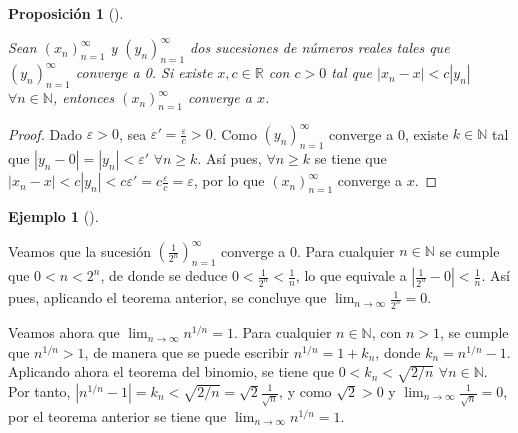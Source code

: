 \documentclass[
  a4paper,
]{scrreport}
\theoremstyle{definition}
\newtheorem{example}{Ejemplo}[chapter]
\theoremstyle{plain}
\theoremstyle{definition}
\theoremstyle{plain}
\theoremstyle{plain}
\newtheorem{proposition}{Proposición}[chapter]
\theoremstyle{remark}
\begin{document}
\leavevmode{}%
\begin{proposition}[]\label{prp-convergencia-sucesion-acotada}

Sean \((x_n)_{n=1}^\infty\) y \((y_n)_{n=1}^\infty\) dos sucesiones de
números reales tales que \((y_n)_{n=1}^\infty\) converge a 0. Si existe
\(x, c\in\mathbb{R}\) con \(c>0\) tal que \(|x_n-x| < c|y_n|\)
\(\forall n\in \mathbb{N}\), entonces \((x_n)_{n=1}^\infty\) converge a
\(x\).

\end{proposition}

\begin{tcolorbox}[enhanced jigsaw, breakable, arc=.35mm, colbacktitle=quarto-callout-note-color!10!white, toptitle=1mm, opacityback=0, colframe=quarto-callout-note-color-frame, colback=white, left=2mm, bottomrule=.15mm, opacitybacktitle=0.6, title=\textcolor{quarto-callout-note-color}{\faInfo}\hspace{0.5em}{Demostración}, toprule=.15mm, titlerule=0mm, coltitle=black, rightrule=.15mm, bottomtitle=1mm, leftrule=.75mm]

\begin{proof}

Dado \(\varepsilon>0\), sea \(\varepsilon'=\frac{\varepsilon}{c}>0\).
Como \((y_n)_{n=1}^\infty\) converge a 0, existe \(k\in\mathbb{N}\) tal
que \(|y_n-0|=|y_n|<\varepsilon'\) \(\forall n\geq k\). Así pues,
\(\forall n\geq k\) se tiene que
\(|x_n-x|<c|y_n|<c\varepsilon'=c\frac{\varepsilon}{c}=\varepsilon\), por
lo que \((x_n)_{n=1}^\infty\) converge a \(x\).

\end{proof}

\end{tcolorbox}

\leavevmode{}%
\begin{example}[]\label{exm-convergencia-sucesion-acotada}

Veamos que la sucesión \(\left(\frac{1}{2^n}\right)_{n=1}^\infty\)
converge a 0. Para cualquier \(n\in\mathbb{N}\) se cumple que
\(0<n<2^n\), de donde se deduce \(0<\frac{1}{2^n}<\frac{1}{n}\), lo que
equivale a \(|\frac{1}{2^n}-0|<\frac{1}{n}\). Así pues, aplicando el
teorema anterior, se concluye que \(\lim_{n\to\infty}\frac{1}{2^n}=0\).

Veamos ahora que \(\lim_{n\to\infty}n^{1/n}=1\). Para cualquier
\(n\in\mathbb{N}\), con \(n>1\), se cumple que \(n^{1/n}>1\), de manera
que se puede escribir \(n^{1/n} = 1+k_n\), donde \(k_n=n^{1/n}-1\).
Aplicando ahora el teorema del binomio, se tiene que
\(0<k_n<\sqrt{2/n}\) \(\forall n\in\mathbb{N}\). Por tanto,
\(|n^{1/n}-1| = k_n < \sqrt{2/n}=\sqrt{2}\frac{1}{\sqrt{n}}\), y como
\(\sqrt{2}>0\) y \(\lim_{n\to\infty}\frac{1}{\sqrt{n}}=0\), por el
teorema anterior se tiene que \(\lim_{n\to\infty} n^{1/n} = 1\).

\end{example}
\end{document}
